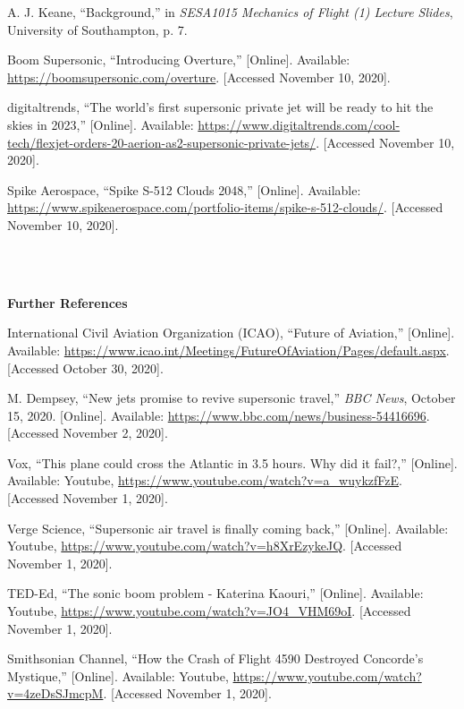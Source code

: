 \documentclass[a4paper,11pt]{article}
\begin{document}
\begin{thebibliography}
{A. J. Keane,}
{``Background,''} in \textit{SESA1015 Mechanics of Flight (1) Lecture Slides}, University of Southampton, p. 7.

{Boom Supersonic,}
{``Introducing Overture,''}
[Online]. Available:
\url{https://boomsupersonic.com/overture}.
[Accessed November 10, 2020].

{digitaltrends,}
{``The world’s first supersonic private jet will be ready to hit the skies in 2023,''}
[Online]. Available:
\url{https://www.digitaltrends.com/cool-tech/flexjet-orders-20-aerion-as2-supersonic-private-jets/}.
[Accessed November 10, 2020].

{Spike Aerospace,}
{``Spike S-512 Clouds 2048,''}
[Online]. Available:
\url{https://www.spikeaerospace.com/portfolio-items/spike-s-512-clouds/}.
[Accessed November 10, 2020].


\ \\ \\
\hspace*{-0.625cm}\begin{Large}\textbf{Further References}\end{Large}

{International Civil Aviation Organization (ICAO)},
``Future of Aviation,''
[Online]. Available:
\url{https://www.icao.int/Meetings/FutureOfAviation/Pages/default.aspx}.
[Accessed October 30, 2020].

{M. Dempsey,}
{``New jets promise to revive supersonic travel,''}
\textit{BBC News},
{October 15, 2020}.
[Online]. Available:
\url{https://www.bbc.com/news/business-54416696}.
[Accessed November 2, 2020].

{Vox},
{``This plane could cross the Atlantic in 3.5 hours. Why did it fail?,''}
[Online]. Available: Youtube,
\url{https://www.youtube.com/watch?v=a_wuykzfFzE}.
[Accessed November 1, 2020].

{Verge Science},
{``Supersonic air travel is finally coming back,''}
[Online]. Available: Youtube,
\url{https://www.youtube.com/watch?v=h8XrEzykeJQ}.
[Accessed November 1, 2020].

{TED-Ed},
{``The sonic boom problem - Katerina Kaouri,''}
[Online]. Available: Youtube,
\url{https://www.youtube.com/watch?v=JO4_VHM69oI}.
[Accessed November 1, 2020].

{Smithsonian Channel},
{``How the Crash of Flight 4590 Destroyed Concorde's Mystique,''}
[Online]. Available: Youtube,
\url{https://www.youtube.com/watch?v=4zeDsSJmcpM}.
[Accessed November 1, 2020].


\end{thebibliography}
\end{document}
